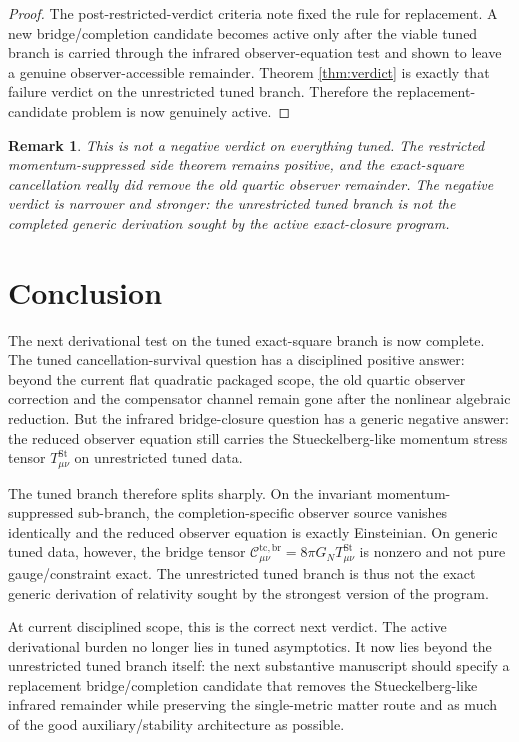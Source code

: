 \documentclass[11pt]{article}
\newtheorem{remark}{Remark}
\begin{document}
\begin{proof}
The post-restricted-verdict criteria note fixed the rule for replacement. A new bridge/completion candidate becomes active only after the viable tuned branch is carried through the infrared observer-equation test and shown to leave a genuine observer-accessible remainder. Theorem \ref{thm:verdict} is exactly that failure verdict on the unrestricted tuned branch. Therefore the replacement-candidate problem is now genuinely active.
\end{proof}

\begin{remark}
This is not a negative verdict on everything tuned. The restricted momentum-suppressed side theorem remains positive, and the exact-square cancellation really did remove the old quartic observer remainder. The negative verdict is narrower and stronger: the unrestricted tuned branch is not the completed generic derivation sought by the active exact-closure program.
\end{remark}

\section{Conclusion}

The next derivational test on the tuned exact-square branch is now complete. The tuned cancellation-survival question has a disciplined positive answer: beyond the current flat quadratic packaged scope, the old quartic observer correction and the compensator channel remain gone after the nonlinear algebraic reduction. But the infrared bridge-closure question has a generic negative answer: the reduced observer equation still carries the Stueckelberg-like momentum stress tensor \(T_{\mu\nu}^{\mathrm{St}}\) on unrestricted tuned data.

The tuned branch therefore splits sharply. On the invariant momentum-suppressed sub-branch, the completion-specific observer source vanishes identically and the reduced observer equation is exactly Einsteinian. On generic tuned data, however, the bridge tensor \( \mathcal C_{\mu\nu}^{\mathrm{tc,br}} = 8\pi G_N T_{\mu\nu}^{\mathrm{St}} \) is nonzero and not pure gauge/constraint exact. The unrestricted tuned branch is thus not the exact generic derivation of relativity sought by the strongest version of the program.

At current disciplined scope, this is the correct next verdict. The active derivational burden no longer lies in tuned asymptotics. It now lies beyond the unrestricted tuned branch itself: the next substantive manuscript should specify a replacement bridge/completion candidate that removes the Stueckelberg-like infrared remainder while preserving the single-metric matter route and as much of the good auxiliary/stability architecture as possible.
\end{document}
